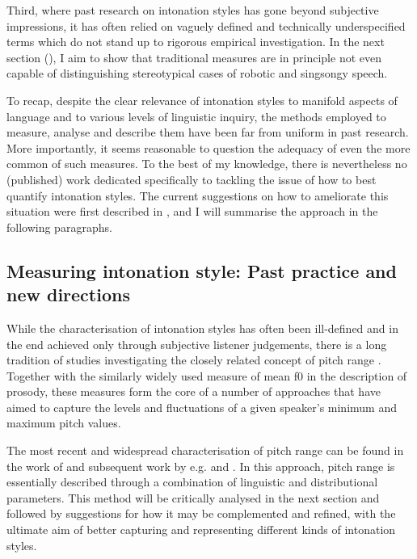 Third, where past research on intonation styles has gone beyond subjective impressions, it has often relied on vaguely defined and technically underspecified terms which do not stand up to rigorous empirical investigation. In the next section (), I aim to show that traditional measures are in principle not even capable of distinguishing stereotypical cases of robotic and singsongy speech.

To recap, despite the clear relevance of intonation styles to manifold aspects of language and to various levels of linguistic inquiry, the methods employed to measure, analyse and describe them have been far from uniform in past research. More importantly, it seems reasonable to question the adequacy of even the more common of such measures. To the best of my knowledge, there is nevertheless no (published) work dedicated specifically to tackling the issue of how to best quantify intonation styles. The current suggestions on how to ameliorate this situation were first described in \citet{wehrleSomewhereSpectrumRobotic2018}, and I will summarise the approach in the following paragraphs.

	\subsection{Measuring intonation style: Past practice and new directions}\label{int_back_measures}

While the characterisation of intonation styles has often been ill-defined and in the end achieved only through subjective listener judgements, there is a long tradition of studies investigating the closely related concept
of pitch range \citep{laddEvidenceIndependentFunction1985,lehistePhoneticStructureParagraphs1975}. Together with the similarly widely used measure of mean f0 in the description of prosody, these measures form the core of a number of approaches that have aimed to capture the levels and fluctuations of a given speaker's minimum and maximum pitch values.

The most recent and widespread characterisation of pitch range can be found in the work of \citet{mennenCrosslanguageDifferencesFundamental2012a} and subsequent work by e.g. \citet{urbaniPitchRangeItalians2013} and \citet{grahamFundamentalFrequencyRange2014}. In this approach, pitch range is essentially described through a combination of linguistic and distributional parameters. This method will be critically analysed in the next section and followed by suggestions for how it may be complemented and refined, with the ultimate aim of better capturing and representing different kinds of intonation styles.


